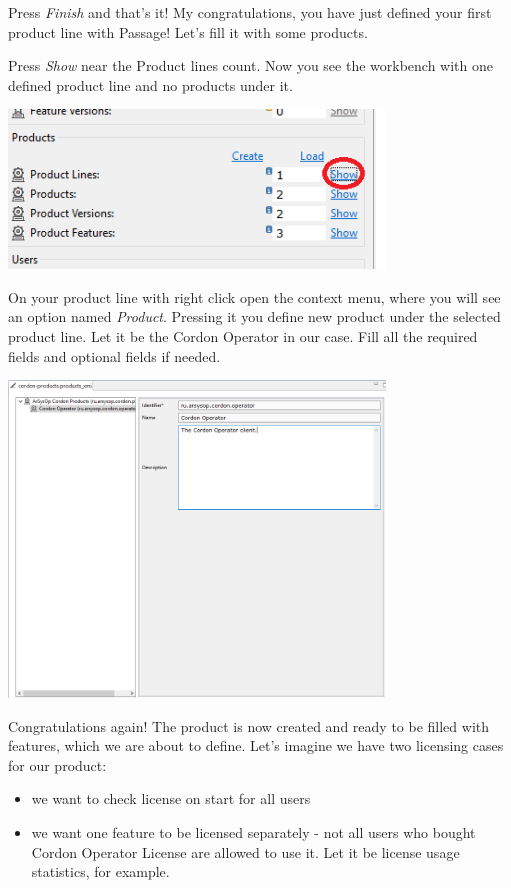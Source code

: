 \documentclass[12pt]{report}
\begin{document}
Press \textit{Finish} and that's it! My congratulations, you have just defined your first product line with Passage! Let's fill it with some products.

Press \textit{Show} near the Product lines count. Now you see the workbench with one defined product line and no products under it.

\begin{center}
    \includegraphics[width=0.75\textwidth]{product_create}
\end{center}

On your product line with right click open the context menu, where you will see an option named \textit{Product}. Pressing it you define new product under the selected product line.
Let it be the Cordon Operator in our case. Fill all the required fields and optional fields if needed.

\begin{center}
    \includegraphics[width=0.75\textwidth]{product_dialog}
\end{center}

Congratulations again! The product is now created and ready to be filled with features, which we are about to define. Let's imagine we have two licensing cases for our product:
\begin{itemize}
    \item we want to check license on start for all users
    \item we want one feature to be licensed separately - not all users who bought Cordon Operator License are allowed to use it. Let it be license usage statistics, for example.
\end{itemize}
\end{document}
